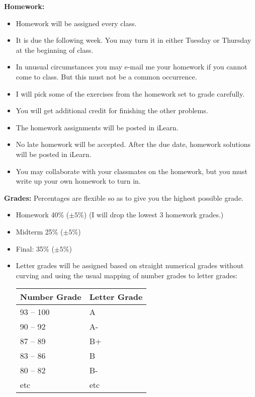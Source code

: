 \documentclass[oneside,12pt]{amsart}
\begin{document}
\bigskip

\textbf{Homework:}
\begin{itemize}
\item Homework will be assigned every class.
\item It is due the following week. You may turn it in either Tuesday or Thursday at the beginning of class.
\item In unusual circumstances you may e-mail me your homework if you cannot come to class. But this must not be a common occurrence.
\item I will pick some of the exercises from the homework set to grade carefully.
\item You will get additional credit for finishing the other problems.
\item The homework assignments will be posted in iLearn.
\item No late homework will be accepted. After the due date, homework solutions will be posted in iLearn.
\item You may collaborate with your classmates on the homework, but you must write up your own homework to turn in.
\end{itemize}

\bigskip

\textbf{Grades:} Percentages are flexible so as to give you the highest possible grade.
\begin{itemize}
\item Homework 40\% ($\pm5\%$) (I will drop the lowest 3 homework grades.)
\item Midterm 25\% ($\pm5\%$)
\item Final: 35\% ($\pm5\%$)
\item Letter grades will be assigned based on straight numerical grades
without curving and using the usual mapping of number grades to letter grades:

\begin{center}
  \begin{tabular}{ | l | l |}
    \hline
    Number Grade & Letter Grade  \\ \hline \hline
    93 -- 100 & A\\ \hline
    90 -- 92 & A- \\ \hline
    87 -- 89 & B+ \\ \hline
    83 -- 86 & B \\ \hline
    80 -- 82 & B- \\ \hline
    etc & etc \\ \hline
  \end{tabular}
\end{center}

\end{itemize}
\end{document}

